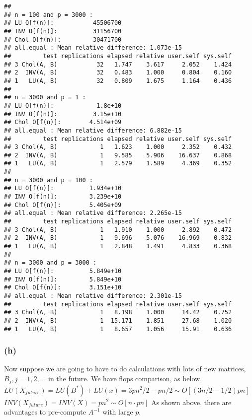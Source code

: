 \documentclass{article}\usepackage{graphicx, color}
\makeatletter
\newenvironment{kframe}{%
 \def\at@end@of@kframe{}%
 \ifinner\ifhmode%
  \def\at@end@of@kframe{\end{minipage}}%
  \begin{minipage}{\columnwidth}%
 \fi\fi%
 \def\FrameCommand##1{\hskip\@totalleftmargin \hskip-\fboxsep
 \colorbox{shadecolor}{##1}\hskip-\fboxsep
     \hskip-\linewidth \hskip-\@totalleftmargin \hskip\columnwidth}%
 \MakeFramed {\advance\hsize-\width
   \@totalleftmargin\z@ \linewidth\hsize
   \@setminipage}}%
 {\par\unskip\endMakeFramed%
 \at@end@of@kframe}
\newenvironment{knitrout}{}{} %
\makeatother
\begin{document}
\begin{knitrout}
\begin{kframe}
\begin{verbatim}
## 
## n = 100 and p = 3000 :
## LU O[f(n)]:           45506700 
## INV O[f(n)]:          31156700 
## Chol O[f(n)]:         30471700 
## all.equal : Mean relative difference: 1.073e-15 
##         test replications elapsed relative user.self sys.self
## 3 Chol(A, B)           32   1.747    3.617     2.052    1.424
## 2  INV(A, B)           32   0.483    1.000     0.804    0.160
## 1   LU(A, B)           32   0.809    1.675     1.164    0.436
## 
## n = 3000 and p = 1 :
## LU O[f(n)]:            1.8e+10 
## INV O[f(n)]:          3.15e+10 
## Chol O[f(n)]:        4.514e+09 
## all.equal : Mean relative difference: 6.882e-15 
##         test replications elapsed relative user.self sys.self
## 3 Chol(A, B)            1   1.623    1.000     2.352    0.432
## 2  INV(A, B)            1   9.585    5.906    16.637    0.868
## 1   LU(A, B)            1   2.579    1.589     4.369    0.352
## 
## n = 3000 and p = 100 :
## LU O[f(n)]:          1.934e+10 
## INV O[f(n)]:         3.239e+10 
## Chol O[f(n)]:        5.405e+09 
## all.equal : Mean relative difference: 2.265e-15 
##         test replications elapsed relative user.self sys.self
## 3 Chol(A, B)            1   1.910    1.000     2.892    0.472
## 2  INV(A, B)            1   9.696    5.076    16.969    0.832
## 1   LU(A, B)            1   2.848    1.491     4.833    0.368
## 
## n = 3000 and p = 3000 :
## LU O[f(n)]:          5.849e+10 
## INV O[f(n)]:         5.849e+10 
## Chol O[f(n)]:        3.151e+10 
## all.equal : Mean relative difference: 2.301e-15 
##         test replications elapsed relative user.self sys.self
## 3 Chol(A, B)            1   8.198    1.000     14.42    0.752
## 2  INV(A, B)            1  15.171    1.851     27.68    1.020
## 1   LU(A, B)            1   8.657    1.056     15.91    0.636
\end{verbatim}
\end{kframe}
\end{knitrout}


\subsubsection*{(h)}
Now suppose we are going to have to do calculations with lots of new matrices, $B_j, j=1,2,...$
in the future. We have flops comparison, as below,
\newline
$LU(X_{future}) = LU(B^*) + LU(x) = 3pn^2/2 -pn/2 \sim O[(3n/2-1/2)pn]$
\newline
$INV(X_{future}) = INV(X) = pn^2 \sim O[n\cdot pn]$
\newline
As shown above, there are advantages to pre-compute $A^{-1}$ with large $p$.
\end{document}
